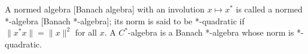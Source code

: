 A normed algebra [Banach algebra] with an involution $x \mapsto x^*$ is called a normed *-algebra [Banach *-algebra]; its norm is said to be *-quadratic if $\|x^*x\| = \|x\|^2$ for all $x$. A $C^*$-algebra is a Banach *-algebra whose norm is *-quadratic.
